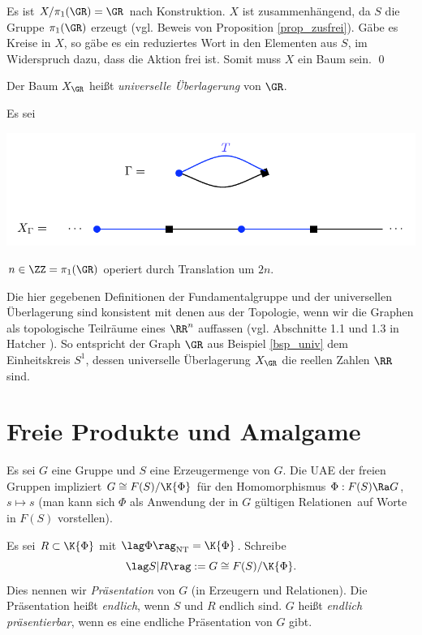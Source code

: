 Es ist $X/\pi_1(\GR)=\GR$ nach Konstruktion. $X$ ist
zusammenhängend, da $S$ die Gruppe $\pi_1(\GR)$ erzeugt
(vgl. Beweis von Proposition \ref{prop_zusfrei}).
Gäbe es Kreise in $X$, so gäbe es ein reduziertes Wort in den
Elementen aus $S$, im Widerspruch dazu, dass die Aktion frei ist.
Somit muss $X$ ein Baum sein.
\qed

\DEF Der Baum $X_{\GR}$ heißt \emph{universelle Überlagerung} von $\GR$.

\BSP\label{bsp_univ} Es sei
\begin{center}
	\includegraphics{grugraImages/univ}
\end{center}
$n\in\ZZ=\pi_1(\GR)$ operiert durch Translation um $2n$.

Die hier gegebenen Definitionen der Fundamentalgruppe und der
universellen Überlagerung sind konsistent mit denen aus der
Topologie, wenn wir die Graphen als topologische Teilräume
eines $\RR^n$ auffassen
(vgl. Abschnitte 1.1 und 1.3 in Hatcher \cite{hatcher}).
So entspricht der Graph $\GR$ aus
Beispiel \ref{bsp_univ} dem Einheitskreis $S^1$, dessen
universelle Überlagerung $X_{\GR}$ die reellen Zahlen $\RR$ sind.


\section{Freie Produkte und Amalgame}\label{sec_amal}


Es sei $G$ eine Gruppe und $S$ eine Erzeugermenge von $G$.
Die UAE der freien Gruppen impliziert
$G\cong F(S)/\K{\Phi}$ für den Homomorphismus
$\Phi:F(S)\Ra G$, $s\mapsto s$ (man kann sich $\Phi$ als
\glqq Anwendung der in $G$ gültigen Relationen\grqq\ auf Worte
in $F(S)$ vorstellen).

\DEF Es sei $R\subset \K{\Phi}$ mit
$\lag\Phi\rag_{\mathrm{NT}} = \K{\Phi}$. Schreibe
\[
\lag S|R \rag := G \cong F(S)/\K{\Phi}.
\]
Dies nennen wir \emph{Präsentation} von $G$
(in Erzeugern und Relationen). Die Präsentation heißt
\emph{endlich},
wenn $S$ und $R$ endlich sind. $G$ heißt \emph{endlich präsentierbar},
wenn es eine endliche Präsentation von $G$ gibt.

